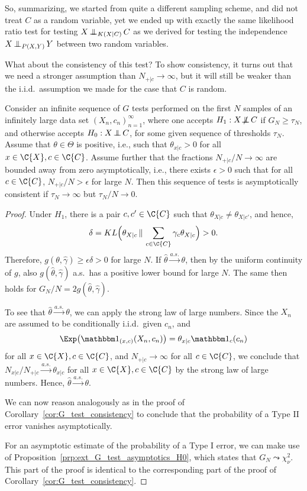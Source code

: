 So, summarizing, we started from quite a different sampling scheme, and did not treat $C$ as a random variable, yet we
ended up with exactly the same likelihood ratio test for testing $X \operatorname*{\perp\mkern-11mu\perp}_{K(X|C)} C$ as we derived 
for testing the independence $X \operatorname*{\perp\mkern-11mu\perp}_{P(X,Y)} Y$ between two random variables.

What about the consistency of this test? To show consistency, it turns out that we need a stronger assumption
than $N_{+|c} \to \infty$, but it will still be weaker than the i.i.d.\ assumption we made for the case that $C$ is random.
\begin{Cor}\label{cor:ext_G_test_consistency}
Consider an infinite sequence of $G$ tests performed on the first $N$ samples of an infinitely large
data set $(X_n,c_n)_{n=1}^\infty$,
where one accepts $H_1 : X \operatorname*{\not\mkern-2mu\perp\mkern-11mu\perp} C$ if $G_N \ge \tau_N$, and otherwise accepts $H_0 : X \operatorname*{\perp\mkern-11mu\perp} C$, 
for some given sequence of thresholds $\tau_N$.
Assume that $\theta \in \Theta$ is positive, i.e., such that $\theta_{x|c} > 0$ for all $x \in \C{X}, c \in \C{C}$.
Assume further that the fractions $N_{+|c} / N \to \infty$ are bounded away from zero asymptotically,
i.e., there exists $\epsilon > 0$ such that for all $c \in \C{C}$, $N_{+|c} / N > \epsilon$ for large $N$.
Then this sequence of tests is asymptotically consistent if $\tau_N \to \infty$ but $\tau_N / N \to 0$.
\end{Cor}
\begin{proof}
Under $H_1$, there is a pair $c,c' \in \C{C}$ such that $\theta_{X|c} \ne \theta_{X|c'}$, and hence,
  $$\delta = KL\Big(\theta_{X|c} \,\Vert\, \sum_{c\in\C{C}} \gamma_c \theta_{X|c}\Big) > 0.$$
Therefore, $g(\theta,\hat\gamma) \ge \epsilon \delta > 0$ for large $N$.
If $\hat\theta \stackrel{a.s.}{\to} \theta$, then by the uniform  continuity of $g$, 
also $g(\hat\theta,\hat\gamma)$ a.s.\ has a positive lower bound for large $N$.
The same then holds for $G_N / N = 2g(\hat\theta,\hat\gamma)$.

To see that $\hat\theta \stackrel{a.s.}{\to} \theta$, we can apply the strong law of large numbers.
Since the $X_n$ are assumed to be conditionally i.i.d.\ given $c_n$, and 
  $$\Exp \big(\I_{(x,c)}(X_n,c_n)\big) = \theta_{x|c} \I_c(c_n)$$
for all $x \in \C{X}, c \in \C{C}$, and $N_{+|c} \to \infty$ for all
$c \in \C{C}$, we conclude that $N_{x|c} / N_{+|c} \stackrel{a.s.}{\to} \theta_{x|c}$ 
for all $x \in \C{X}, c \in \C{C}$
by the strong law of large numbers. Hence, $\hat\theta \stackrel{a.s.}{\to} \theta$.

We can now reason analogously as in the proof of 
Corollary~\ref{cor:G_test_consistency} to conclude that
the probability of a Type II error vanishes asymptotically.

For an asymptotic estimate of the probability of a Type I error,
we can make use of Proposition~\ref{prp:ext_G_test_asymptotics_H0},
which states that $G_N \leadsto \chi_{\nu}^2$. 
This part of the proof is identical to the corresponding part of the proof of Corollary~\ref{cor:G_test_consistency}.
\end{proof}
